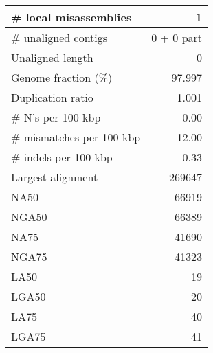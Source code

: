 \documentclass[12pt,a4paper]{article}
\begin{document}
\begin{table}[ht]
\begin{center}
\begin{tabular}{|l*{1}{|r}|}
\# local misassemblies & 1 \\ \hline
\# unaligned contigs & 0 + 0 part \\ \hline
Unaligned length & 0 \\ \hline
Genome fraction (\%) & 97.997 \\ \hline
Duplication ratio & 1.001 \\ \hline
\# N's per 100 kbp & 0.00 \\ \hline
\# mismatches per 100 kbp & 12.00 \\ \hline
\# indels per 100 kbp & 0.33 \\ \hline
Largest alignment & 269647 \\ \hline
NA50 & 66919 \\ \hline
NGA50 & 66389 \\ \hline
NA75 & 41690 \\ \hline
NGA75 & 41323 \\ \hline
LA50 & 19 \\ \hline
LGA50 & 20 \\ \hline
LA75 & 40 \\ \hline
LGA75 & 41 \\ \hline
\end{tabular}
\end{center}
\end{table}
\end{document}

